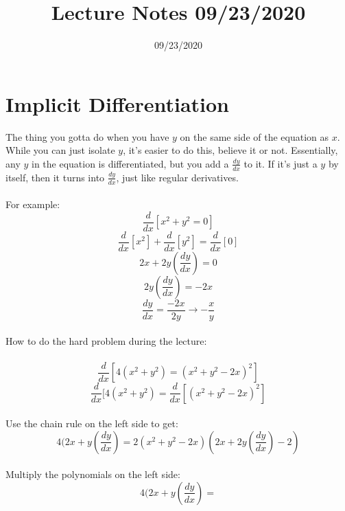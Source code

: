 \documentclass{article}
\begin{document}
\title{Lecture Notes 09/23/2020}
\date{09/23/2020}
\maketitle

\section{Implicit Differentiation}
The thing you gotta do when you have $y$ on the same side of the equation as $x$. While you can just isolate $y$, it's easier to do this, believe it or not. Essentially, any $y$ in the equation is differentiated, but you add a $\frac{dy}{dx}$ to it. If it's just a $y$ by itself, then it turns into $\frac{dy}{dx}$, just like regular derivatives.\\\\
For example:\\
\begin{equation}
\frac{d}{dx}[x^2 + y^2 = 0]
\end{equation}
\[\frac{d}{dx}[x^2] + \frac{d}{dx}[y^2] = \frac{d}{dx}[0]\]
\[2x + 2y(\frac{dy}{dx}) = 0\]
\[2y(\frac{dy}{dx}) = -2x\]
\[\frac{dy}{dx} = \frac{-2x}{2y} \to -\frac{x}{y}\]\\
How to do the hard problem during the lecture:\\\\
\begin{equation}
\frac{d}{dx}[4(x^2 + y^2) = (x^2 + y^2 - 2x)^2]
\end{equation}
\[\frac{d}{dx}[4(x^2 + y^2) = \frac{d}{dx}[(x^2 + y^2 - 2x)^2]\]\\
Use the chain rule on the left side to get:
\[4(2x + y(\frac{dy}{dx}) = 2(x^2 + y^2 - 2x)(2x + 2y(\frac{dy}{dx}) - 2)\]\\
Multiply the polynomials on the left side:
\[4(2x + y(\frac{dy}{dx}) = \]
\end{document}
